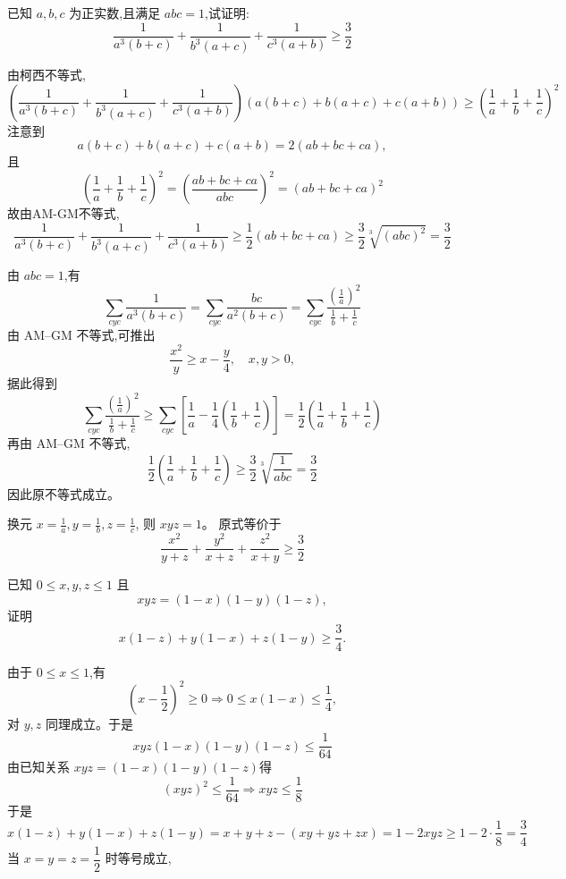 \begin{questions}
    \question 已知 $a,b,c$ 为正实数,且满足 $abc=1$,试证明:
    \[
    \frac{1}{a^{3}(b+c)} + \frac{1}{b^{3}(a+c)} + \frac{1}{c^{3}(a+b)} \ge \frac{3}{2}
    \]
    \begin{solution}
        由柯西不等式,
        \[
        \left(\frac{1}{a^{3}(b+c)} + \frac{1}{b^{3}(a+c)} + \frac{1}{c^{3}(a+b)}\right) (a(b+c) + b(a+c) + c(a+b)) \ge \left(\frac{1}{a} + \frac{1}{b} + \frac{1}{c}\right)^2
        \]
        注意到
        \[
        a(b+c) + b(a+c) + c(a+b) = 2(ab + bc + ca),
        \]
        且
        \[
        \left(\frac{1}{a} + \frac{1}{b} + \frac{1}{c}\right)^2 = \left(\frac{ab + bc + ca}{abc}\right)^2 = (ab + bc + ca)^2
        \]
        故由AM-GM不等式,
        \[
        \frac{1}{a^{3}(b+c)} + \frac{1}{b^{3}(a+c)} + \frac{1}{c^{3}(a+b)} \ge \frac{1}{2}(ab + bc + ca)
        \ge \frac{3}{2}\sqrt[3]{(abc)^2} = \frac{3}{2}
        \]
    \end{solution}
    \begin{solution}
        由 $abc=1$,有
        \[
        \sum_{cyc} \frac{1}{a^3(b+c)} = \sum_{cyc} \frac{bc}{a^2(b+c)} = \sum_{cyc} \frac{(\frac{1}{a})^2}{\frac{1}{b}+\frac{1}{c}}
        \]
        由 AM–GM 不等式,可推出
        \[
        \frac{x^2}{y} \ge x - \frac{y}{4}, \quad x,y>0,
        \]
        据此得到
        \[
        \sum_{cyc} \frac{(\frac{1}{a})^2}{\frac{1}{b}+\frac{1}{c}} \ge \sum_{cyc} \left[ \frac{1}{a} - \frac{1}{4}\left( \frac{1}{b} + \frac{1}{c} \right) \right] = \frac{1}{2} \left( \frac{1}{a} + \frac{1}{b} + \frac{1}{c} \right)
        \]
        再由 AM–GM 不等式,
        \[
        \frac{1}{2} \left( \frac{1}{a} + \frac{1}{b} + \frac{1}{c} \right) \ge \frac{3}{2} \sqrt[3]{\frac{1}{abc}} = \frac{3}{2}
        \]
        因此原不等式成立。
    \end{solution}
\begin{solution}
    换元 $x = \frac{1}{a}, y = \frac{1}{b}, z = \frac{1}{c}$, 则 $xyz = 1$。
    原式等价于
    \[
    \frac{x^2}{y+z} + \frac{y^2}{x+z} + \frac{z^2}{x+y} \ge \frac{3}{2}
    \]
\end{solution}

    \question 已知 $0\le x,y,z\le1$ 且
    \[
    xyz=(1-x)(1-y)(1-z),
    \]
    证明
    \[
    x(1-z)+y(1-x)+z(1-y)\ge\frac{3}{4}.
    \]
    \begin{solution}
        由于 $0\le x\le1$,有
        \[
        (x-\frac12)^2 \ge 0 \Rightarrow 0\le x(1-x)\le\frac14,
        \]
        对 $y,z$ 同理成立。于是
        \[
        xyz(1-x)(1-y)(1-z)\le\frac{1}{64}
        \]
        由已知关系 $xyz=(1-x)(1-y)(1-z)$得
        \[
        (xyz)^2\le\frac{1}{64} \Rightarrow xyz\le\frac{1}{8}
        \]
        于是
        \[
        x(1-z)+y(1-x)+z(1-y)= x+y+z - (xy+yz+zx)= 1 - 2xyz \ge 1-2\cdot\frac{1}{8}=\frac{3}{4}
        \]
        当 $x=y=z=\dfrac12$ 时等号成立,
    \end{solution}


\end{questions}
